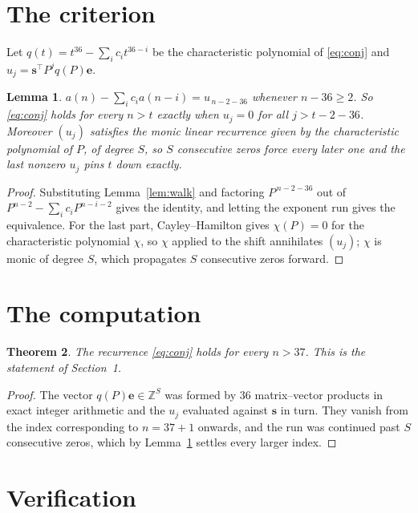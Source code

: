 \documentclass[11pt,a4paper]{article}
\theoremstyle{plain}
\newtheorem{theorem}{Theorem}
\newtheorem{lemma}[theorem]{Lemma}
\theoremstyle{definition}
\begin{document}
\section{The criterion}

Let $q(t)=t^{36}-\sum_i c_i t^{36-i}$ be the characteristic polynomial of
\eqref{eq:conj} and $u_j=\mathbf{s}^{\!\top}P^{j}q(P)\mathbf{e}$.

\begin{lemma}\label{lem:crit}
$a(n)-\sum_i c_i a(n-i)=u_{\,n-2-36}$ whenever $n-36\ge2$. So \eqref{eq:conj}
holds for every $n>t$ exactly when $u_j=0$ for all $j>t-2-36$. Moreover $(u_j)$
satisfies the monic linear recurrence given by the characteristic polynomial of $P$, of
degree $S$, so $S$ consecutive zeros force every later one and the last nonzero $u_j$ pins
$t$ down exactly.
\end{lemma}

\begin{proof}
Substituting Lemma~\ref{lem:walk} and factoring $P^{\,n-2-36}$ out of
$P^{n-2}-\sum_i c_i P^{n-i-2}$ gives the identity, and letting the exponent run gives the
equivalence. For the last part, Cayley--Hamilton gives $\chi(P)=0$ for the characteristic
polynomial $\chi$, so $\chi$ applied to the shift annihilates $(u_j)$; $\chi$ is monic of
degree $S$, which propagates $S$ consecutive zeros forward.
\end{proof}

\section{The computation}

\begin{theorem}
The recurrence \eqref{eq:conj} holds for every $n>37$. This is the statement of
Section~1.
\end{theorem}

\begin{proof}
The vector $q(P)\mathbf{e}\in\mathbb{Z}^{S}$ was formed by $36$ matrix--vector
products in exact integer arithmetic and the $u_j$ evaluated against $\mathbf{s}$ in turn.
They vanish from the index corresponding to $n=37+1$ onwards, and the run was continued
past $S$ consecutive zeros, which by Lemma~\ref{lem:crit} settles every larger index.
\end{proof}

\section{Verification}
\end{document}

